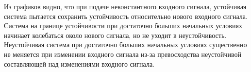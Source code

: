 Из графиков видно, что при подаче неконстантного входного сигнала, устойчивая система пытается сохранить 
устойчивость относительно нового входного сигнала. Система на границе устойчивости при достаточно больших начальных
условиях начинает колебаться около нового сигнала, но не уходит в неустойчивость. Неустойчивая система
при достаточно больших начальных условиях существенно не меняется при изменении входного сигнала из-за
превосходства неустойчивой составляющей над изменениями входного сигнала.
\endinput